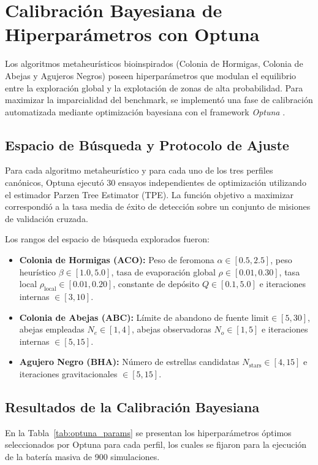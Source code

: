 \section{Calibración Bayesiana de Hiperparámetros con Optuna}

Los algoritmos metaheurísticos bioinspirados (Colonia de Hormigas, Colonia de Abejas y Agujeros Negros) poseen hiperparámetros que modulan el equilibrio entre la exploración global y la explotación de zonas de alta probabilidad. Para maximizar la imparcialidad del benchmark, se implementó una fase de calibración automatizada mediante optimización bayesiana con el framework \textit{Optuna} \cite{akiba2019optuna}.

\subsection{Espacio de Búsqueda y Protocolo de Ajuste}

Para cada algoritmo metaheurístico y para cada uno de los tres perfiles canónicos, Optuna ejecutó $30$ ensayos independientes de optimización utilizando el estimador Parzen Tree Estimator (TPE). La función objetivo a maximizar correspondió a la tasa media de éxito de detección sobre un conjunto de misiones de validación cruzada.

Los rangos del espacio de búsqueda explorados fueron:
\begin{itemize}
    \item \textbf{Colonia de Hormigas (ACO):} Peso de feromona $\alpha \in [0.5, 2.5]$, peso heurístico $\beta \in [1.0, 5.0]$, tasa de evaporación global $\rho \in [0.01, 0.30]$, tasa local $\rho_{\text{local}} \in [0.01, 0.20]$, constante de depósito $Q \in [0.1, 5.0]$ e iteraciones internas $\in [3, 10]$.
    \item \textbf{Colonia de Abejas (ABC):} Límite de abandono de fuente $\text{limit} \in [5, 30]$, abejas empleadas $N_e \in [1, 4]$, abejas observadoras $N_o \in [1, 5]$ e iteraciones internas $\in [5, 15]$.
    \item \textbf{Agujero Negro (BHA):} Número de estrellas candidatas $N_{\text{stars}} \in [4, 15]$ e iteraciones gravitacionales $\in [5, 15]$.
\end{itemize}

\subsection{Resultados de la Calibración Bayesiana}

En la Tabla~\ref{tab:optuna_params} se presentan los hiperparámetros óptimos seleccionados por Optuna para cada perfil, los cuales se fijaron para la ejecución de la batería masiva de 900 simulaciones.

